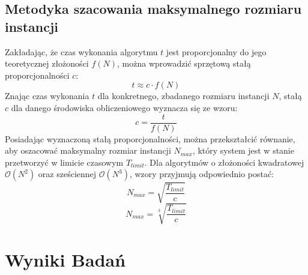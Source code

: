 \documentclass[conference]{IEEEtran}
\begin{document}
        \subsection{Metodyka szacowania maksymalnego rozmiaru instancji}
            Zakładając, że czas wykonania algorytmu $t$ jest proporcjonalny do jego teoretycznej złożoności $f(N)$, można wprowadzić sprzętową stałą proporcjonalności $c$:
            \begin{equation}
                t \approx c \cdot f(N)
            \end{equation}
            Znając czas wykonania $t$ dla konkretnego, zbadanego rozmiaru instancji $N$, stałą $c$ dla danego środowiska obliczeniowego wyznacza się ze wzoru:
            \begin{equation}
                c = \frac{t}{f(N)}
            \end{equation}
            Posiadając wyznaczoną stałą proporcjonalności, można przekształcić równanie, aby oszacować maksymalny rozmiar instancji $N_{max}$, który system jest w stanie przetworzyć w limicie czasowym $T_{limit}$. Dla algorytmów o złożoności kwadratowej $\mathcal{O}(N^2)$ oraz sześciennej $\mathcal{O}(N^3)$, wzory przyjmują odpowiednio postać:
            \begin{equation}
                N_{max} = \sqrt{\frac{T_{limit}}{c}}
            \end{equation}
            \begin{equation}
                N_{max} = \sqrt[3]{\frac{T_{limit}}{c}}
            \end{equation}


    \section{Wyniki Badań}
\end{document}
